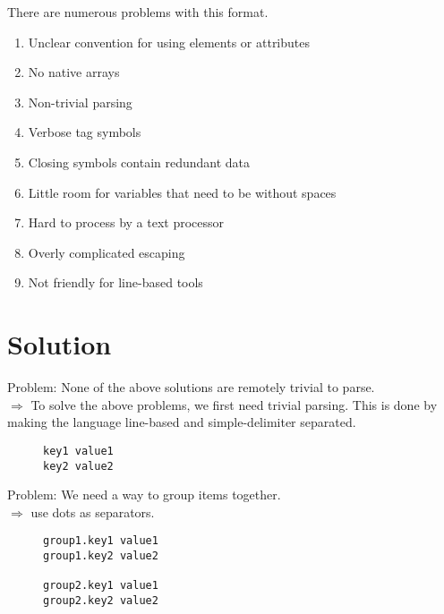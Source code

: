 \documentclass[listof=totoc]{article}
\begin{document}
\noindent There are numerous problems with this format.

\begin{enumerate}
  \item Unclear convention for using elements or attributes
  \item No native arrays
  \item Non-trivial parsing
  \item Verbose tag symbols
  \item Closing symbols contain redundant data
  \item Little room for variables that need to be without spaces
  \item Hard to process by a text processor
  \item Overly complicated escaping
  \item Not friendly for line-based tools
\end{enumerate}

\section{Solution}
\noindent Problem: None of the above solutions are remotely trivial to parse. \\
$\Rightarrow$ To solve the above problems, we first need trivial parsing. This is done by making the language line-based and simple-delimiter separated.


\begin{figure}[H]
\centering
\begin{varwidth}{\linewidth}
\begin{verbatim}
key1 value1
key2 value2
\end{verbatim}
\end{varwidth}
\caption{}
\end{figure}

\noindent Problem: We need a way to group items together. \\
$\Rightarrow$ use dots as separators.


\begin{figure}[H]
\centering
\begin{varwidth}{\linewidth}
\begin{verbatim}
group1.key1 value1
group1.key2 value2

group2.key1 value1
group2.key2 value2
\end{verbatim}
\end{varwidth}
\caption{}
\end{figure}
\end{document}
